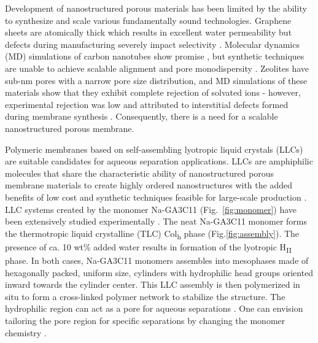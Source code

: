 \documentclass{article}
\begin{document}

  Development of nanostructured porous materials has been limited by the
  ability to synthesize and scale various fundamentally sound technologies.
  Graphene sheets are atomically thick which results in excellent water
  permeability but defects during manufacturing severely impact selectivity
  \cite{cohen-tanugi_multilayer_2016}. Molecular dynamics (MD) simulations of
  carbon nanotubes show promise \cite{humplik_nanostructured_2011}, but synthetic
  techniques are unable to achieve scalable alignment and pore monodispersity
  \cite{hata_water-assisted_2004,maruyama_growth_2005}. Zeolites have sub-nm
  pores with a narrow pore size distribution, and MD simulations of these
  materials show that they exhibit complete rejection of solvated ions
  \cite{murad_molecular_1998}- however, experimental rejection was low and
  attributed to interstitial defects formed during membrane synthesis
  \cite{li_desalination_2004}. Consequently, there is a need for a scalable
  nanostructured porous membrane. 

  Polymeric membranes based on self-assembling lyotropic liquid crystals (LLCs)
  are suitable candidates for aqueous separation applications. LLCs are
  amphiphilic molecules that share the characteristic ability of nanostructured
  porous membrane materials to create highly ordered nanostructures with the
  added benefits of low cost and synthetic techniques feasible for large-scale
  production \cite{feng_scalable_2014}. LLC systems created by the monomer
  Na-GA3C11 (Fig.~\ref{fig:monomer}) have been extensively studied experimentally
  \cite{feng_scalable_2014,smith_ordered_1997,zhou_supported_2005,resel_h2-phase_2000,feng_thin_2016}.
  The neat Na-GA3C11 monomer forms the thermotropic liquid crystalline (TLC)
  Col\textsubscript{h} phase (Fig.\ref{fig:assembly}). The presence of ca. 10
  wt\% added water results in formation of the lyotropic H\textsubscript{II}
  phase. In both cases, Na-GA3C11 monomers assembles into mesophases made of
  hexagonally packed, uniform size, cylinders with hydrophilic head groups
  oriented inward towards the cylinder center. This LLC assembly is then
  polymerized in situ to form a cross-linked polymer network to stabilize the
  structure. The hydrophilic region can act as a pore for aqueous separations
  \cite{zhou_supported_2005}.  One can envision tailoring the pore region for
  specific separations by changing the monomer chemistry
  \cite{resel_h2-phase_2000}.
\end{document}
